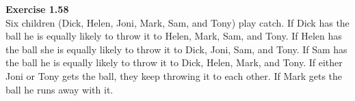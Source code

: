 \documentclass[12pt]{article}
\begin{document}
\newpage
\textbf{Exercise 1.58}\\
Six children (Dick, Helen, Joni, Mark, Sam, and Tony) play catch. If Dick has the ball he is equally likely to throw it to Helen, Mark, Sam, and Tony. If Helen has the ball she is equally likely to throw it to Dick, Joni, Sam, and Tony. If Sam has the ball he is equally likely to throw it to Dick, Helen, Mark, and Tony. If either Joni or Tony gets the ball, they keep throwing it to each other. If Mark gets the ball he runs away with it. 
\end{document}
